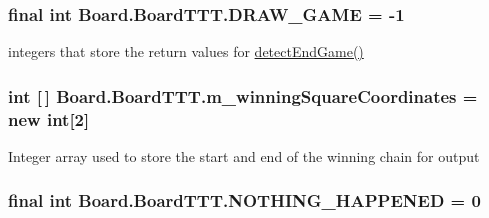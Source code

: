 \subsubsection[{D\+R\+A\+W\+\_\+\+G\+A\+M\+E}]{\setlength{\rightskip}{0pt plus 5cm}final int Board.\+Board\+T\+T\+T.\+D\+R\+A\+W\+\_\+\+G\+A\+M\+E = -\/1\hspace{0.3cm}{\ttfamily [static]}}\label{class_board_1_1_board_t_t_t_a16be9cbe57d43388a3fa6e5b706210e5}
integers that store the return values for \hyperlink{class_board_1_1_board_t_t_t_a08f36da4210111d8f129be28a550334e}{detect\+End\+Game()} \hypertarget{class_board_1_1_board_t_t_t_a50bc789f0168c29495d4827cca10c89f}{}
\subsubsection[{m\+\_\+winning\+Square\+Coordinates}]{\setlength{\rightskip}{0pt plus 5cm}int \mbox{[}$\,$\mbox{]} Board.\+Board\+T\+T\+T.\+m\+\_\+winning\+Square\+Coordinates = new int\mbox{[}2\mbox{]}\hspace{0.3cm}{\ttfamily [private]}}\label{class_board_1_1_board_t_t_t_a50bc789f0168c29495d4827cca10c89f}
Integer array used to store the start and end of the winning chain for output \hypertarget{class_board_1_1_board_t_t_t_a5448324216e6a32d3264e50779962562}{}
\subsubsection[{N\+O\+T\+H\+I\+N\+G\+\_\+\+H\+A\+P\+P\+E\+N\+E\+D}]{\setlength{\rightskip}{0pt plus 5cm}final int Board.\+Board\+T\+T\+T.\+N\+O\+T\+H\+I\+N\+G\+\_\+\+H\+A\+P\+P\+E\+N\+E\+D = 0\hspace{0.3cm}{\ttfamily [static]}}\label{class_board_1_1_board_t_t_t_a5448324216e6a32d3264e50779962562}
\hypertarget{class_board_1_1_board_t_t_t_a989aacd76a6193fe54a4500dd8151b41}{}
